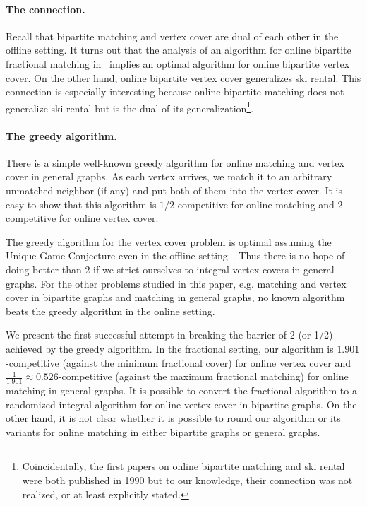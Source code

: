 \documentclass{article}
\begin{document}
\paragraph{The connection.}
Recall that bipartite matching and vertex cover are dual of each other in the offline setting. It turns out that the analysis of an algorithm for online bipartite fractional matching in~\cite{Buchbinder2007} implies an optimal algorithm for online bipartite vertex cover. On the other hand, online bipartite vertex cover generalizes ski rental. This connection is especially interesting because online bipartite matching does not generalize ski rental but is the dual of its generalization\footnote{Coincidentally, the first papers on online bipartite matching and ski rental were both published in 1990 but to our knowledge, their connection was not realized, or at least explicitly stated.}.

\paragraph{The greedy algorithm.}
There is a simple well-known greedy algorithm for online matching and vertex cover in general graphs. As each vertex arrives, we match it to an arbitrary unmatched neighbor (if any) and put both of them into the vertex cover. It is easy to show that this algorithm is $1/2$-competitive for online matching and $2$-competitive for online vertex cover.

The greedy algorithm for the vertex cover problem is optimal assuming the Unique Game Conjecture even in the offline setting~\cite{Khot2008}. Thus there is no hope of doing better than 2 if we strict ourselves to integral vertex covers in general graphs.  For the other problems studied in this paper, e.g. matching and vertex cover in bipartite graphs and matching in general graphs, no known algorithm beats the greedy algorithm in the online setting.

We present the first successful attempt in breaking the barrier of 2 (or 1/2) achieved by the greedy algorithm. In the fractional setting, our algorithm is $1.901$-competitive (against the minimum fractional cover) for online vertex cover and $\frac{1}{1.901}\approx 0.526$-competitive (against the maximum fractional matching) for online matching in general graphs. It is possible to convert the fractional algorithm to a randomized integral algorithm for online vertex cover in bipartite graphs. On the other hand, it is not clear whether it is possible to round our algorithm or its variants for online matching in either bipartite graphs or general graphs.
\end{document}
